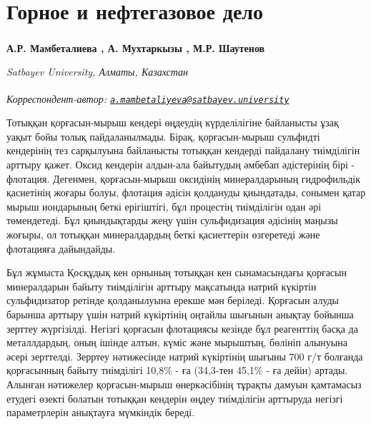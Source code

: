 \newpage
\let\cleardoublepage\clearpage
\chapter{Горное и нефтегазовое дело}

\begin{articleheader}

{\bfseries
А.Р. Мамбеталиева\textsuperscript{\envelope } ,
А. Мухтаркызы ,
М.Р. Шаутенов} 
\end{articleheader}

\begin{affiliation}
\emph{Satbayev University, Алматы, Казахстан}

\raggedright \textsuperscript{\envelope }{\em Корреспондент-автор: \href{mailto:a.mambetaliyeva@satbayev.university}{\nolinkurl{a.mambetaliyeva@satbayev.university}}}
\end{affiliation}

Тотыққан қорғасын-мырыш кендері өңдеудің күрделілігіне байланысты ұзақ
уақыт бойы толық пайдаланылмады. Бірақ, қорғасын-мырыш сульфидті
кендерінің тез сарқылуына байланысты тотыққан кендерді пайдалану
тиімділігін арттыру қажет. Оксид кендерін алдын-ала байытудың әмбебап
әдістерінің бірі - флотация. Дегенмен, қорғасын-мырыш оксидінің
минералдарының гидрофильдік қасиетінің жоғары болуы, флотация әдісін
қолдануды қиындатады, сонымен қатар мырыш иондарының беткі ерігіштігі,
бұл процестің тиімділігін одан әрі төмендетеді. Бұл қиындықтарды жеңу
үшін сульфидизация әдісінің маңызы жоғыры, ол тотыққан минералдардың
беткі қасиеттерін өзгеретеді және флотацияға дайындайды.

Бұл жұмыста Қосқұдық кен орнының тотыққан кен сынамасындағы қорғасын
минералдарын байыту тиімділігін арттыру мақсатында натрий күкіртін
сульфидизатор ретінде қолданылуына ерекше мән беріледі. Қорғасын алуды
барынша арттыру үшін натрий күкіртінің оңтайлы шығынын анықтау бойынша
зерттеу жүргізілді. Негізгі қорғасын флотациясы кезінде бұл реагенттің
басқа да металлдардың, оның ішінде алтын, күміс және мырыштың, бөлініп
алынуына әсері зерттелді. Зерртеу нәтижесінде натрий күкіртінің шығыны
700 г/т болғанда қорғасынның байыту тиімділігі 10,8\% - ға (34,3-тен
45,1\% - ға дейін) артады. Алынған нәтижелер қорғасын-мырыш
өнеркәсібінің тұрақты дамуын қамтамасыз етудегі өзекті болатын тотыққан
кендерін өңдеу тиімділігін арттыруда негізгі параметрлерін анықтауға
мүмкіндік береді.

